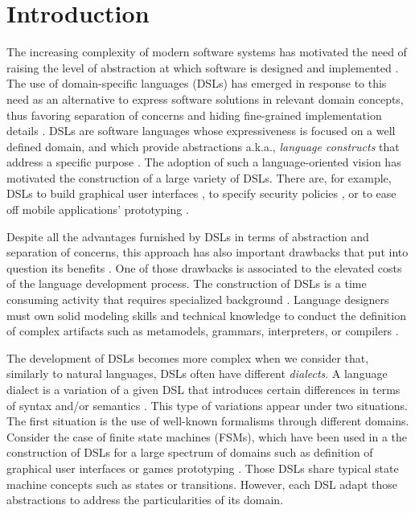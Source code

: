 \section{Introduction}

The increasing complexity of modern software systems has motivated the need of raising the level of abstraction at which software is designed and implemented \cite{Chechik:2010}. The use of domain-specific languages (DSLs) has emerged in response to this need as an alternative to express software solutions in relevant domain concepts, thus favoring separation of concerns and hiding fine-grained implementation details \cite{Jezequel:2014}. DSLs are software languages whose expressiveness is focused on a well defined domain, and which provide abstractions a.k.a., \textit{language constructs} that address a specific purpose \cite{Mernik:2005b}. The adoption of such a language-oriented vision has motivated the construction of a large variety of DSLs. There are, for example, DSLs to build graphical user interfaces \cite{Oney:2012}, to specify security policies \cite{Lodderstedt:2002}, or to ease off mobile applications' prototyping \cite{Ribeiro:2014}.

Despite all the advantages furnished by DSLs in terms of abstraction and separation of concerns, this approach has also important drawbacks that put into question its benefits \cite{Gray:2008}. One of those drawbacks is associated to the elevated costs of the language development process. The construction of DSLs is a time consuming activity that requires specialized background \cite{Jezequel:2014}. Language designers must own solid modeling skills and technical knowledge to conduct the definition of complex artifacts such as metamodels, grammars, interpreters, or compilers \cite{Jezequel:2014}. %

The development of DSLs becomes more complex when we consider that, similarly to natural languages, DSLs often have different \textit{dialects}. A language dialect is a variation of a given DSL that introduces certain differences in terms of syntax and/or semantics \cite{Homer:2014}. This type of variations appear under two situations. The first situation is the use of well-known formalisms through different domains. Consider the case of finite state machines (FSMs), which have been used in a the construction of DSLs for a large spectrum of domains such as definition of graphical user interfaces \cite{Oney:2012} or games prototyping \cite{Funk:2012}. Those DSLs share typical state machine concepts such as states or transitions. However, each DSL adapt those abstractions to address the particularities of its domain. 

